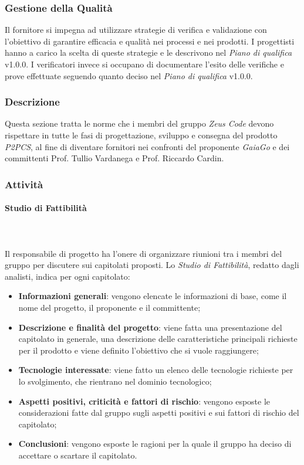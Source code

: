 	\subsubsection{Gestione della Qualità}
	Il fornitore si impegna ad utilizzare strategie di verifica e validazione con l'obiettivo di garantire efficacia e qualità nei processi e nei prodotti. I progettisti hanno a carico la scelta di queste strategie e le descrivono nel \textit{Piano di qualifica} v1.0.0. I verificatori invece si occupano di documentare l'esito delle verifiche e prove effettuate seguendo quanto deciso nel \textit{Piano di qualifica} v1.0.0.
	\subsubsection{Descrizione}
	Questa sezione tratta le norme che i membri del gruppo \textit{Zeus Code} devono rispettare in tutte le fasi di progettazione, sviluppo e consegna del prodotto \textit{P2PCS}, al fine di diventare fornitori nei confronti del proponente \textit{GaiaGo} e dei committenti Prof. Tullio Vardanega e Prof. Riccardo Cardin.
	\subsubsection{Attività}
		\paragraph{Studio di Fattibilità} \mbox{}\\ \mbox{}\\
		Il responsabile di progetto ha l'onere di organizzare riunioni tra i membri del gruppo per discutere sui capitolati proposti.
		Lo \textit{Studio di Fattibilità}, redatto dagli analisti, indica per ogni capitolato\glo:
		\begin{itemize}
			\item \textbf{Informazioni generali}: vengono elencate le informazioni di base, come il nome del progetto, il proponente e il committente;
			\item \textbf{Descrizione e finalità del progetto}: viene fatta una presentazione del capitolato in generale, una descrizione delle caratteristiche principali richieste per il prodotto e viene definito l'obiettivo che si vuole raggiungere;
			\item \textbf{Tecnologie interessate}: viene fatto un elenco delle tecnologie richieste per lo svolgimento, che rientrano nel dominio tecnologico;
			\item \textbf{Aspetti positivi, criticità e fattori di rischio}: vengono esposte le considerazioni fatte dal gruppo sugli aspetti positivi e sui fattori di rischio del capitolato;
			\item \textbf{Conclusioni}: vengono esposte le ragioni per la quale il gruppo ha deciso di accettare o scartare il capitolato.
		\end{itemize}
